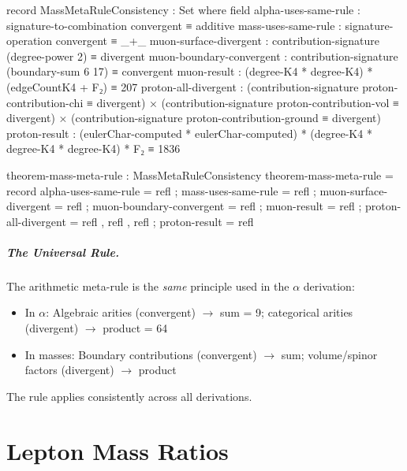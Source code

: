 \documentclass[11pt,a4paper]{book}
\begin{document}
\begin{code}
record MassMetaRuleConsistency : Set where
  field
    alpha-uses-same-rule     : signature-to-combination convergent ≡ additive
    mass-uses-same-rule      : signature-operation convergent ≡ _+_
    muon-surface-divergent   : contribution-signature (degree-power 2) ≡ divergent
    muon-boundary-convergent : contribution-signature (boundary-sum 6 17) ≡ convergent
    muon-result              : (degree-K4 * degree-K4) * (edgeCountK4 + F₂) ≡ 207
    proton-all-divergent     : (contribution-signature proton-contribution-chi ≡ divergent) ×
                               (contribution-signature proton-contribution-vol ≡ divergent) ×
                               (contribution-signature proton-contribution-ground ≡ divergent)
    proton-result            : (eulerChar-computed * eulerChar-computed) * (degree-K4 * degree-K4 * degree-K4) * F₂ ≡ 1836

theorem-mass-meta-rule : MassMetaRuleConsistency
theorem-mass-meta-rule = record
  { alpha-uses-same-rule     = refl
  ; mass-uses-same-rule      = refl
  ; muon-surface-divergent   = refl
  ; muon-boundary-convergent = refl
  ; muon-result              = refl
  ; proton-all-divergent     = refl , refl , refl
  ; proton-result            = refl
  }
\end{code}

\paragraph{The Universal Rule.}

The arithmetic meta-rule is the \emph{same} principle used in the $\alpha$ derivation:
\begin{itemize}
\item In $\alpha$: Algebraic arities (convergent) $\to$ sum = 9; categorical arities (divergent) $\to$ product = 64
\item In masses: Boundary contributions (convergent) $\to$ sum; volume/spinor factors (divergent) $\to$ product
\end{itemize}

The rule applies consistently across all derivations.

\chapter{Lepton Mass Ratios}
\label{chap:lepton-masses}
\end{document}
